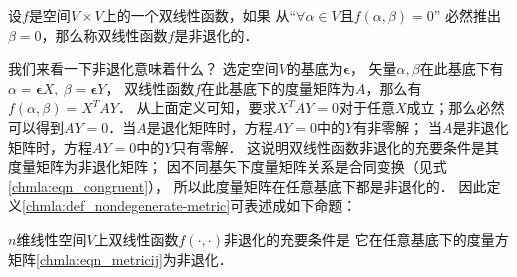 \begin{definition}\label{chmla:def_nondegenerate-metric}
    设$f$是空间$V\times V$上的一个双线性函数，如果 
    从“$\forall \alpha \in V \text{且} f(\alpha,\beta)=0$”
    必然推出$\beta =0$，那么称双线性函数$f$是{\heiti 非退化的}．
\end{definition}
我们来看一下非退化意味着什么？
选定空间$V$的基底为$\boldsymbol{\epsilon}$，
矢量$\alpha,\beta$在此基底下有
$\alpha= {\boldsymbol{\epsilon}} X,\ \beta= {\boldsymbol{\epsilon}} Y$，
双线性函数$f$在此基底下的度量矩阵为$A$，那么有
$f(\alpha,\beta)= X^T A Y$．
从上面定义可知，要求$X^T A Y=0$对于任意$X$成立；那么必然
可以得到$AY=0$．当$A$是退化矩阵时，方程$AY=0$中的$Y$有非零解；
当$A$是非退化矩阵时，方程$AY=0$中的$Y$只有零解．
这说明双线性函数非退化的充要条件是其度量矩阵为非退化矩阵；
因不同基矢下度量矩阵关系是合同变换（见式\eqref{chmla:eqn_congruent}），
所以此度量矩阵在任意基底下都是非退化的．
因此定义\ref{chmla:def_nondegenerate-metric}可表述成如下命题：
\begin{proposition}\label{chmla:thm_nondegenerate-metric}
    $n$维线性空间$V$上双线性函数$f(\cdot,\cdot)$非退化的充要条件是
    它在任意基底下的度量方矩阵\eqref{chmla:eqn_metricij}为非退化．
\end{proposition}

